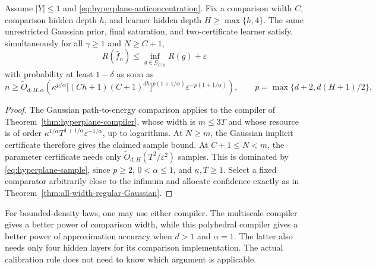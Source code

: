 \begin{corollary}
\label{cor:hyperplane-oracle}
Assume $|Y|\le1$ and \eqref{eq:hyperplane-anticoncentration}. Fix a comparison width $C$, comparison hidden depth $h$, and learner hidden depth $H\ge\max\{h,4\}$. The same unrestricted Gaussian prior, final saturation, and two-certificate learner satisfy, simultaneously for all $\gamma\ge1$ and $N\ge C+1$,
\[
 R(\widehat f_n)\le\inf_{g\in\mathcal G_{C,h}}R(g)+\varepsilon
\]
with probability at least $1-\delta$ as soon as
\begin{equation}
 n\ge\widetilde O_{d,H,\alpha}\left(
 \kappa^{p/\alpha}
 \bigl[(Ch+1)(C+1)^{dh}\bigr]^{p(1+1/\alpha)}
 \varepsilon^{-p(1+1/\alpha)}\right),
 \qquad p=\max\{d+2,d(H+1)/2\}.
 \label{eq:hyperplane-sample}
\end{equation}
\end{corollary}
\begin{proof}
The Gaussian path-to-energy comparison applies to the compiler of Theorem~\ref{thm:hyperplane-compiler}, whose width is $m\le3T$ and whose resource is of order
$\kappa^{1/\alpha}T^{1+1/\alpha}\varepsilon^{-1/\alpha}$, up to logarithms. At $N\ge m$, the Gaussian implicit certificate therefore gives the claimed sample bound. At $C+1\le N<m$, the parameter certificate needs only $\widetilde O_{d,H}(T^2/\varepsilon^2)$ samples. This is dominated by \eqref{eq:hyperplane-sample}, since $p\ge2$, $0<\alpha\le1$, and $\kappa,T\ge1$. Select a fixed comparator arbitrarily close to the infimum and allocate confidence exactly as in Theorem~\ref{thm:all-width-regular-Gaussian}.
\end{proof}

For bounded-density laws, one may use either compiler. The multiscale compiler gives a better power of comparison width, while this polyhedral compiler gives a better power of approximation accuracy when $d>1$ and $\alpha=1$. The latter also needs only four hidden layers for its comparison implementation. The actual calibration rule does not need to know which argument is applicable.

